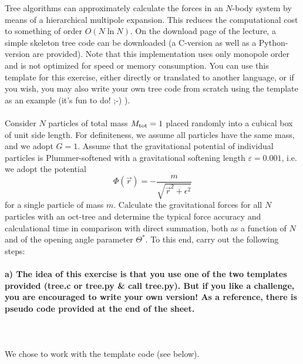 Tree algorithms can approximately calculate the forces in an 
$N$-body system by means of a hierarchical multipole expansion. 
This reduces the computational cost to something of order 
$O(N \ln N)$. On the download page of the lecture, a simple 
skeleton tree code can be downloaded (a C-version as well as a 
Python-version are provided). Note that this implementation uses 
only monopole order and is not optimized for speed or memory 
consumption. You can use this template for this exercise, 
either directly or translated to another language, or if you 
wish, you may also write your own tree code from scratch using 
the template as an example (it’s fun to do! ;-) ). \\
\\
Consider $N$ particles of total mass $M_{\textnormal{tot}}=1$ 
placed randomly into a cubical box of unit side length. For 
definiteness, we assume all particles have the same mass, and 
we adopt $G=1$. Assume that the gravitational potential of 
individual particles is Plummer-softened with a gravitational 
softening length $\varepsilon=0.001$, 
i.e. we adopt the potential
\begin{equation}
    \Phi(\vec r)=-\frac{m}{\sqrt{\vec r^2+\epsilon^2}}
\end{equation}
for a single particle of mass $m$.
Calculate the gravitational forces for all $N$ particles with an 
oct-tree and determine the typical force accuracy and 
calculational time in comparison with direct summation, both as 
a function of $N$ and of the opening angle parameter $\Theta^*$. 
To this end, carry out the following steps:


\paragraph{a) The idea of this exercise is that you use one of 
    the two templates provided (tree.c or tree.py \& call 
    tree.py). But if you like a challenge, you are encouraged 
    to write your own version! As a reference, there is pseudo 
    code provided at the end of the sheet.
} \ \\
    \\
    We chose to work with the template code (see below).


\newpage
